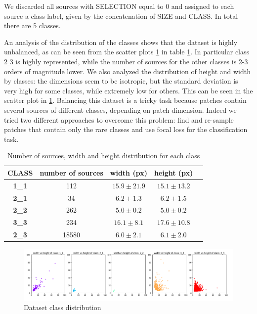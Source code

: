\documentclass[a4paper,10pt]{report}
\begin{document}
We discarded all sources with SELECTION equal to 0 and assigned to each source a class label, given by the concatenation of SIZE and CLASS. In total there are 5 classes. 

An analysis of the distribution of the classes shows that the dataset is highly unbalanced, as can be seen from the scatter plots \ref{fig:scatter_class} in table \ref{table:class_analysis}. In particular class $2\_3$ is highly represented, while the number of sources for the other classes is 2-3 orders of magnitude lower. We also analyzed the distribution of height and width by classes: the dimensions seem to be isotropic, but the standard deviation is very high for some classes, while extremely low for others. This can be seen in the scatter plot in \ref{fig:scatter_class}.
Balancing this dataset is a tricky task because patches contain several sources of different classes, depending on patch dimension. Indeed we tried two different approaches to overcome this problem: find and re-sample patches that contain only the rare classes and use focal loss for the classification task.
\begin{table}[h]
  \center
  \begin{tabular}{|c|c|c|c|c|}
    \hline
    \textbf{CLASS}& \textbf{number of sources} & \textbf{width (px)} & \textbf{height (px)} \\ 
    \hline
    \textbf{1_1} & 112 & $15.9\pm21.9$ & $15.1\pm13.2$ \\ 
    \hline
    \textbf{2_1} & 34 & $6.2\pm1.3$ & $6.2\pm1.5$ \\ 
    \hline
    \textbf{2_2} & 262 & $5.0\pm0.2$ & $5.0\pm0.2$ \\ 
    \hline
    \textbf{3_3} & 234 & $16.1\pm8.1$ & $17.6\pm10.8$ \\ 
    \hline
    \textbf{2_3} & 18580 & $6.0\pm2.1$ & $6.1\pm2.0$ \\ 
    \hline
  \end{tabular}
  \caption{Number of sources, width and height distribution for each class}
  \label{table:class_analysis}
\end{table}

\begin{figure}[h]
  \center
  \includegraphics[width=0.85\linewidth]{scatter_class.png}
  \caption{Dataset class distribution}
  \label{fig:scatter_class}
\end{figure}
\end{document}
